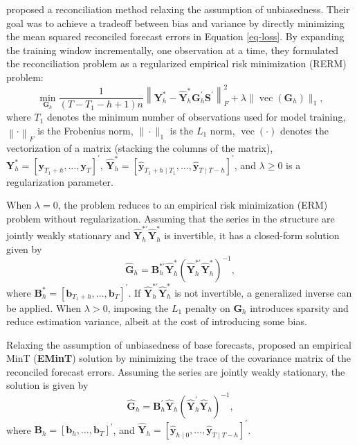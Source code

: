 \documentclass[
  11pt]{article}
\theoremstyle{plain}
\theoremstyle{remark}
\begin{document}
\citet{Ben_Taieb2019-be} proposed a reconciliation method relaxing the
assumption of unbiasedness. Their goal was to achieve a tradeoff between
bias and variance by directly minimizing the mean squared reconciled
forecast errors in Equation \eqref{eq-loss}. By expanding the training
window incrementally, one observation at a time, they formulated the
reconciliation problem as a regularized empirical risk minimization
(RERM) problem: \[
\min_{\bm{G}_h} \frac{1}{(T-T_1-h+1)n}\left\|\bm{Y}_{h}^{*}-\hat{\bm{Y}}_{h}^{*} \bm{G}_{h}^{\prime} \bm{S}^{\prime}\right\|_F^2+\lambda\|\operatorname{vec}( \bm{G}_h)\|_1,
\] where \(T_1\) denotes the minimum number of observations used for
model training, \(\left\| \cdot \right\|_F\) is the Frobenius norm,
\(\|\cdot\|_1\) is the \(L_1\) norm, \(\operatorname{vec}(\cdot)\)
denotes the vectorization of a matrix (stacking the columns of the
matrix),
\(\bm{Y}_{h}^{*}=\left[\bm{y}_{T_1+h}, \ldots, \bm{y}_T\right]^{\prime}\),
\(\hat{\bm{Y}}_{h}^{*}=\left[\hat{\bm{y}}_{T_1+h \mid T_1}, \ldots, \hat{\bm{y}}_{T \mid T-h}\right]^{\prime}\),
and \(\lambda \geq 0\) is a regularization parameter.

When \(\lambda = 0\), the problem reduces to an empirical risk
minimization (ERM) problem without regularization. Assuming that the
series in the structure are jointly weakly stationary and
\(\hat{\bm{Y}}_{h}^{*\prime}\hat{\bm{Y}}_{h}^{*}\) is invertible, it has
a closed-form solution given by \[
\hat{\bm{G}}_h = \bm{B}_{h}^{*\prime}\hat{\bm{Y}}_{h}^{*}\left(\hat{\bm{Y}}_{h}^{*\prime}\hat{\bm{Y}}_{h}^{*}\right)^{-1},
\] where
\(\bm{B}_{h}^{*}=\left[\bm{b}_{T_1+h}, \ldots, \bm{b}_T\right]^{\prime}\).
If \(\hat{\bm{Y}}_{h}^{*\prime}\hat{\bm{Y}}_{h}^{*}\) is not invertible,
a generalized inverse can be applied. When \(\lambda > 0\), imposing the
\(L_1\) penalty on \(\bm{G}_h\) introduces sparsity and reduce
estimation variance, albeit at the cost of introducing some bias.

Relaxing the assumption of unbiasedness of base forecasts,
\citet{Wickramasuriya2021-am} proposed an empirical MinT
(\textbf{EMinT}) solution by minimizing the trace of the covariance
matrix of the reconciled forecast errors. Assuming the series are
jointly weakly stationary, the solution is given by \[
\hat{\bm{G}}_{h} = \bm{B}_{h}^{\prime}\hat{\bm{Y}}_{h}\left(\hat{\bm{Y}}_{h}^{\prime}\hat{\bm{Y}}_{h}\right)^{-1},
\] where
\(\bm{B}_{h}=\left[\bm{b}_{h}, \ldots, \bm{b}_T\right]^{\prime}\), and
\(\hat{\bm{Y}}_{h}=\left[\hat{\bm{y}}_{h \mid 0}, \ldots, \hat{\bm{y}}_{T \mid T-h}\right]^{\prime}\).
\end{document}
